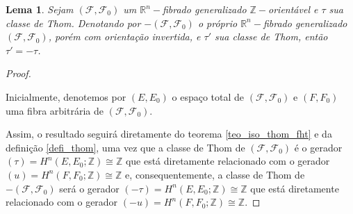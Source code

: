 \documentclass[12pt,oneside]{book} %
\newtheorem{lem}    {\hspace{0.5cm}Lema}[chapter]
\newcommand{\R}{\mathbb{R}}
\newcommand{\Z}{\mathbb{Z}}
\begin{document}
\begin{lem}\label{lema_thom_4}
	Sejam $(\mathcal{F},\mathcal{F}_{0})$ um $\R^{n}-$fibrado generalizado $\Z-$orientável e $\tau$ sua classe de Thom. Denotando por $-(\mathcal{F},\mathcal{F}_{0})$ o próprio $\R^{n}-$fibrado generalizado $(\mathcal{F},\mathcal{F}_{0})$, porém com orientação invertida, e $\tau'$ sua classe de Thom, então $\tau'=-\tau$.
\end{lem}
\begin{proof}
	
	\
	
	\par Inicialmente, denotemos por $(E,E_{0})$ o espaço total de $(\mathcal{F},\mathcal{F}_{0})$ e $(F,F_{0})$ uma fibra arbitrária de $(\mathcal{F},\mathcal{F}_{0})$.
	
	\par Assim, o resultado seguirá diretamente do teorema \ref{teo_iso_thom_fht} e da definição \ref{defi_thom}, uma vez que a classe de Thom de $(\mathcal{F},\mathcal{F}_{0})$ é o gerador $(\tau)=H^{n}(E,E_{0};\Z)\cong\Z$ que está diretamente relacionado com o gerador $(u)=H^{n}(F,F_{0};\Z)\cong\Z$ e, consequentemente, a classe de Thom de $-(\mathcal{F},\mathcal{F}_{0})$ será o gerador $(-\tau)=H^{n}(E,E_{0};\Z)\cong\Z$ que está diretamente relacionado com o gerador $(-u)=H^{n}(F,F_{0};\Z)\cong\Z$.
	
\end{proof}
\end{document}
